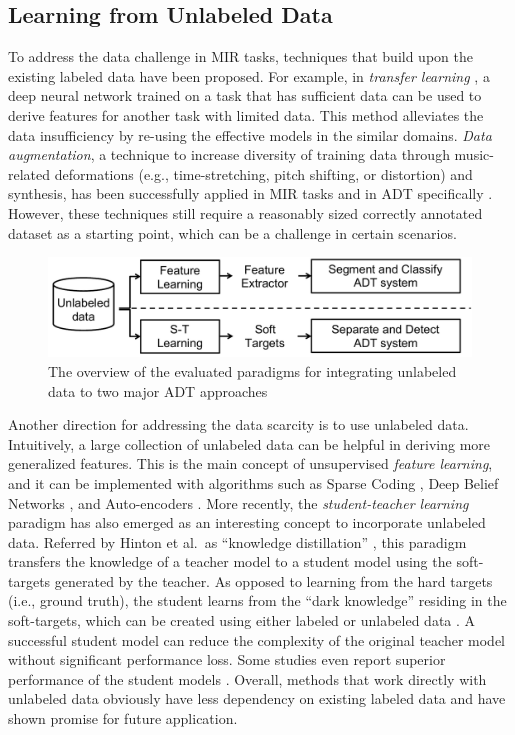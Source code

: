 \documentclass{article}
\begin{document}
\subsection{Learning from Unlabeled Data}
\label{subsec:learnFromUnlabeledData}
To address the data challenge in MIR tasks, techniques that build upon the existing labeled data have been proposed. For example, in \textit{transfer learning} \cite{Choi2017a}, a deep neural network trained on a task that has sufficient data can be used to derive features for another task with limited data. This method alleviates the data insufficiency by re-using the effective models in the similar domains. \textit{Data augmentation}, a technique to increase diversity of training data through music-related deformations (e.g., time-stretching, pitch shifting, or distortion) and synthesis, has been successfully applied in MIR tasks \cite{Mcfee2015} and in ADT specifically \cite{Wu2016, Vogl2017_icassp}. However, these techniques still require a reasonably sized correctly annotated dataset as a starting point, which can be a challenge in certain scenarios. 
\begin{figure}
\centering
\includegraphics[width = \columnwidth]{./figs/paradigms_overview.pdf}
\caption{The overview of the evaluated paradigms for integrating unlabeled data to two major ADT approaches}
\label{fig:overview}
\end{figure}

Another direction for addressing the data scarcity is to use unlabeled data. Intuitively, a large collection of unlabeled data can be helpful in deriving more generalized features. This is the main concept of unsupervised \textit{feature learning}, and it can be implemented with algorithms such as Sparse Coding \cite{Raina2007a}, Deep Belief Networks \cite{Hamel2010}, and Auto-encoders \cite{Masci2011}. More recently, the \textit{student-teacher learning} paradigm has also emerged as an interesting concept to incorporate unlabeled data. Referred by Hinton et al.~as ``knowledge distillation'' \cite{Hinton2015}, this paradigm transfers the knowledge of a teacher model to a student model using the soft-targets generated by the teacher. As opposed to learning from the hard targets (i.e., ground truth), the student learns from the ``dark knowledge'' residing in the soft-targets, which can be created using either labeled or unlabeled data \cite{Li2014}. A successful student model can reduce the complexity of the original teacher model without significant performance loss. Some studies even report superior performance of the student models \cite{Cui2017,Watanabe2017, Wu2017}. Overall, methods that work directly with unlabeled data obviously have less dependency on existing labeled data and have shown promise for future application. 
\end{document}

